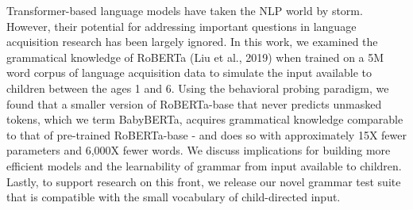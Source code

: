 Transformer-based language models have taken the NLP world by storm. However, their potential for addressing important questions in language acquisition research has been largely ignored. In this work, we examined the grammatical knowledge of RoBERTa (Liu et al., 2019) when trained on a 5M word corpus of language acquisition data to simulate the input available to children between the ages 1 and 6. Using the behavioral probing paradigm, we found that a smaller version of RoBERTa-base that never predicts unmasked tokens, which we term BabyBERTa, acquires grammatical knowledge comparable to that of pre-trained RoBERTa-base - and does so with approximately 15X fewer parameters and 6,000X fewer words. We discuss implications for building more efficient models and the learnability of grammar from input available to children. Lastly, to support research on this front, we release our novel grammar test suite that is compatible with the small vocabulary of child-directed input.
